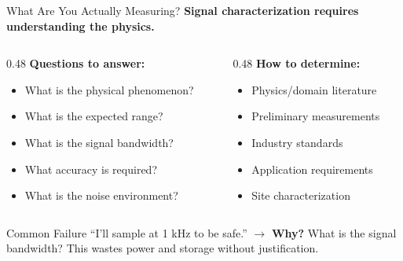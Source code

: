 \documentclass[aspectratio=169,11pt]{beamer}
\begin{document}
\begin{frame}{What Are You Actually Measuring?}
    \textbf{Signal characterization requires understanding the physics.}
    
    \vspace{0.3cm}
    \begin{columns}[T]
        \begin{column}{0.48\textwidth}
            \textbf{Questions to answer:}
            \begin{itemize}
                \item What is the physical phenomenon?
                \item What is the expected range?
                \item What is the signal bandwidth?
                \item What accuracy is required?
                \item What is the noise environment?
            \end{itemize}
        \end{column}
        \begin{column}{0.48\textwidth}
            \textbf{How to determine:}
            \begin{itemize}
                \item Physics/domain literature
                \item Preliminary measurements
                \item Industry standards
                \item Application requirements
                \item Site characterization
            \end{itemize}
        \end{column}
    \end{columns}
    
    \vspace{0.3cm}
    \begin{alertblock}{Common Failure}
        ``I'll sample at 1 kHz to be safe.'' $\rightarrow$ \textbf{Why?} What is the signal bandwidth? This wastes power and storage without justification.
    \end{alertblock}
\end{frame}
\end{document}
